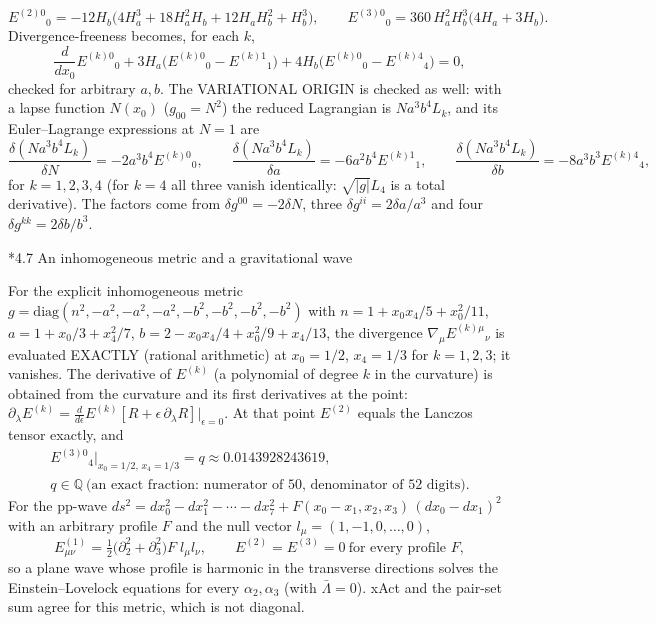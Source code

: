 \documentclass[10pt,a4paper]{article}
\makeatletter
\renewcommand\subsection{\@startsection{subsection}{2}{\z@}{-3.25ex\@plus -1ex \@minus -.2ex}{1.5ex \@plus .2ex}{\normalfont\large\bfseries\raggedright}}
\makeatother
\begin{document}
\begin{equation*}
E^{(2)0}{}_0=-12H_b\big(4H_a^3+18H_a^2H_b+12H_aH_b^2+H_b^3\big),\qquad E^{(3)0}{}_0=360\,H_a^2H_b^3\big(4H_a+3H_b\big).
\end{equation*}
Divergence-freeness becomes, for each $k$,
\begin{equation*}
\frac{d}{dx_0}E^{(k)0}{}_0+3H_a\big(E^{(k)0}{}_0-E^{(k)1}{}_1\big)+4H_b\big(E^{(k)0}{}_0-E^{(k)4}{}_4\big)=0,
\end{equation*}
checked for arbitrary $a,b$. The VARIATIONAL ORIGIN is checked as well: with a lapse function $N(x_0)$ ($g_{00}=N^2$) the reduced Lagrangian is $N a^3b^4L_k$, and its Euler–Lagrange expressions at $N=1$ are
\begin{equation*}
\frac{\delta(Na^3b^4L_k)}{\delta N}=-2a^3b^4E^{(k)0}{}_0,\qquad \frac{\delta(Na^3b^4L_k)}{\delta a}=-6a^2b^4E^{(k)1}{}_1,\qquad \frac{\delta(Na^3b^4L_k)}{\delta b}=-8a^3b^3E^{(k)4}{}_4,
\end{equation*}
for $k=1,2,3,4$ (for $k=4$ all three vanish identically: $\sqrt{|g|}L_4$ is a total derivative). The factors come from $\delta g^{00}=-2\delta N$, three $\delta g^{ii}=2\delta a/a^3$ and four $\delta g^{kk}=2\delta b/b^3$.

\subsection*{4.7 An inhomogeneous metric and a gravitational wave}
For the explicit inhomogeneous metric $g=\mathrm{diag}(n^2,-a^2,-a^2,-a^2,-b^2,-b^2,-b^2,-b^2)$ with $n=1+x_0x_4/5+x_0^2/11$, $a=1+x_0/3+x_4^2/7$, $b=2-x_0x_4/4+x_0^2/9+x_4/13$, the divergence $\nabla_\mu E^{(k)\mu}{}_\nu$ is evaluated EXACTLY (rational arithmetic) at $x_0=1/2$, $x_4=1/3$ for $k=1,2,3$; it vanishes. The derivative of $E^{(k)}$ (a polynomial of degree $k$ in the curvature) is obtained from the curvature and its first derivatives at the point: $\partial_\lambda E^{(k)}=\frac{d}{d\epsilon}E^{(k)}[R+\epsilon\,\partial_\lambda R]\big|_{\epsilon=0}$. At that point $E^{(2)}$ equals the Lanczos tensor exactly, and
\begin{gather*}
E^{(3)0}{}_4\big|_{x_0=1/2,\,x_4=1/3}=q\approx 0.0143928243619,\\ q\in\mathbb Q\ \text{(an exact fraction: numerator of 50, denominator of 52 digits)} .
\end{gather*}
For the pp-wave $ds^2=dx_0^2-dx_1^2-\cdots-dx_7^2+F(x_0-x_1,x_2,x_3)\,(dx_0-dx_1)^2$ with an arbitrary profile $F$ and the null vector $l_\mu=(1,-1,0,\dots,0)$,
\begin{equation*}
E^{(1)}_{\mu\nu}=\tfrac12\big(\partial_2^2+\partial_3^2\big)F\;l_\mu l_\nu,\qquad E^{(2)}=E^{(3)}=0\ \text{for every profile }F,
\end{equation*}
so a plane wave whose profile is harmonic in the transverse directions solves the Einstein–Lovelock equations for every $\alpha_2,\alpha_3$ (with $\bar\Lambda=0$). xAct and the pair-set sum agree for this metric, which is not diagonal.
\end{document}
